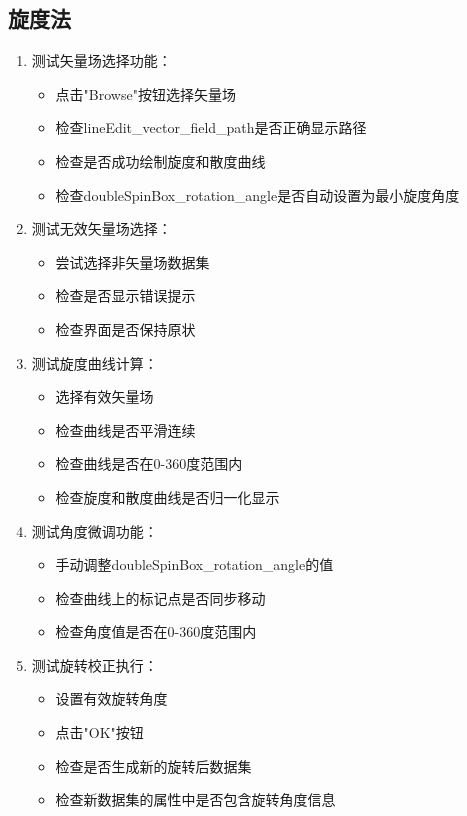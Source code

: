 \documentclass[a4paper,12pt]{report}	%
\begin{document}
\subsection{旋度法}
\begin{enumerate}
    \item 测试矢量场选择功能：
    \begin{itemize}
        \item 点击"Browse"按钮选择矢量场
        \item 检查lineEdit\_vector\_field\_path是否正确显示路径
        \item 检查是否成功绘制旋度和散度曲线
        \item 检查doubleSpinBox\_rotation\_angle是否自动设置为最小旋度角度
    \end{itemize}

    \item 测试无效矢量场选择：
    \begin{itemize}
        \item 尝试选择非矢量场数据集
        \item 检查是否显示错误提示
        \item 检查界面是否保持原状
    \end{itemize}

    \item 测试旋度曲线计算：
    \begin{itemize}
        \item 选择有效矢量场
        \item 检查曲线是否平滑连续
        \item 检查曲线是否在0-360度范围内
        \item 检查旋度和散度曲线是否归一化显示
    \end{itemize}

    \item 测试角度微调功能：
    \begin{itemize}
        \item 手动调整doubleSpinBox\_rotation\_angle的值
        \item 检查曲线上的标记点是否同步移动
        \item 检查角度值是否在0-360度范围内
    \end{itemize}

    \item 测试旋转校正执行：
    \begin{itemize}
        \item 设置有效旋转角度
        \item 点击"OK"按钮
        \item 检查是否生成新的旋转后数据集
        \item 检查新数据集的属性中是否包含旋转角度信息
    \end{itemize}


\end{enumerate}
\end{document}
